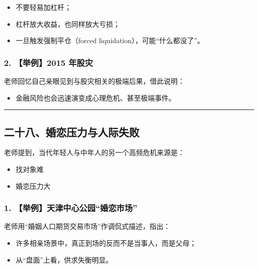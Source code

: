 \documentclass[
  chinese,
  9pt,
  a4paper,
]{ctexart}
\providecommand{\tightlist}{%
  \setlength{\itemsep}{0pt}\setlength{\parskip}{0pt}}
\begin{document}
\begin{itemize}
\tightlist
\item
  不要轻易加杠杆；
\item
  杠杆放大收益，也同样放大亏损；
\item
  一旦触发强制平仓（forced liquidation），可能``什么都没了''。
\end{itemize}

\subsubsection{2. 【举例】2015
年股灾}\label{ux4e3eux4f8b2015-ux5e74ux80a1ux707e}

老师回忆自己亲眼见到与股灾相关的极端后果，借此说明：

\begin{itemize}
\tightlist
\item
  金融风险也会迅速演变成心理危机、甚至极端事件。
\end{itemize}

\begin{center}\rule{0.5\linewidth}{0.5pt}\end{center}

\subsection{二十八、婚恋压力与人际失败}\label{ux4e8cux5341ux516bux5a5aux604bux538bux529bux4e0eux4ebaux9645ux5931ux8d25}

老师提到，当代年轻人与中年人的另一个高频危机来源是：

\begin{itemize}
\tightlist
\item
  找对象难
\item
  婚恋压力大
\end{itemize}

\subsubsection{1.
【举例】天津中心公园``婚恋市场''}\label{ux4e3eux4f8bux5929ux6d25ux4e2dux5fc3ux516cux56edux5a5aux604bux5e02ux573a}

老师用``婚姻人口期货交易市场''作调侃式描述，指出：

\begin{itemize}
\tightlist
\item
  许多相亲场景中，真正到场的反而不是当事人，而是父母；
\item
  从``盘面''上看，供求失衡明显。
\end{itemize}
\end{document}
